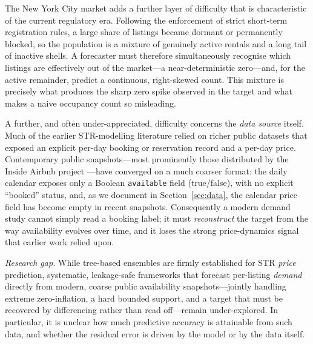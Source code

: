 \documentclass[review,12pt]{elsarticle}
\begin{document}
The New York City market adds a further layer of difficulty that is characteristic
of the current regulatory era. Following the enforcement of strict short-term
registration rules, a large share of listings became dormant or permanently
blocked, so the population is a mixture of genuinely active rentals and a long tail
of inactive shells. A forecaster must therefore simultaneously recognise which
listings are effectively out of the market---a near-deterministic zero---and, for
the active remainder, predict a continuous, right-skewed count. This mixture is
precisely what produces the sharp zero spike observed in the target and what makes
a naive occupancy count so misleading.

A further, and often under-appreciated, difficulty concerns the \emph{data source}
itself. Much of the earlier STR-modelling literature relied on richer public
datasets that exposed an explicit per-day booking or reservation record and a
per-day price. Contemporary public snapshots---most prominently those distributed
by the Inside Airbnb project \citep{insideairbnb}---have converged on a much coarser
format: the daily calendar exposes only a Boolean \texttt{available} field
(true/false), with no explicit ``booked'' status, and, as we document in
Section~\ref{sec:data}, the calendar price field has become empty in recent
snapshots. Consequently a modern demand study cannot simply read a booking label;
it must \emph{reconstruct} the target from the way availability evolves over time,
and it loses the strong price-dynamics signal that earlier work relied upon.

\emph{Research gap.} While tree-based ensembles are firmly established for
STR \emph{price} prediction, systematic, leakage-safe frameworks that forecast
per-listing \emph{demand} directly from modern, coarse public availability
snapshots---jointly handling extreme zero-inflation, a hard bounded support, and a
target that must be recovered by differencing rather than read off---remain
under-explored. In particular, it is unclear how much predictive accuracy is
attainable from such data, and whether the residual error is driven by the model
or by the data itself.
\end{document}
